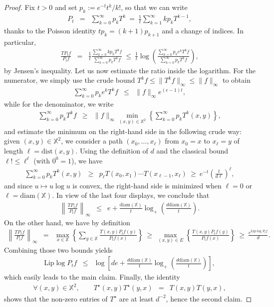 \documentclass[12pt,final]{article}
\numberwithin{equation}{section}
\newcommand{\Lip}{\mathrm {Lip}}
\newcommand{\dX}{\mathbb{X}}
\newcommand{\dist}{\mathrm{dist}}
\newcommand{\diam}{\mathrm{diam}}
\begin{document}
\begin{proof}
Fix $t>0$ and set $p_k:=e^{-t}t^k/k!$, so that we can write
\begin{eqnarray*}
P_t & = & \sum_{k=0}^\infty p_k T^{k} \ = \ \frac{1}{t}\sum_{k=1}^\infty {kp_{k}}T^{k-1}, 
\end{eqnarray*}
thanks to the Poisson identity $tp_k=(k+1)p_{k+1}$ and a change of indices. In particular, 
\begin{eqnarray*}
\frac{TP_t f}{P_tf} & = & \frac{1}{t}\frac{\sum_{k=0}^\infty k p_{k} T^{k}f}{\sum_{k=0}^\infty p_{k} T^{k}f} \
 \le \ \frac{1}{t}\log\left(\frac{\sum_{k=0}^\infty p_{k}e^k T^{k}f}{\sum_{k=0}^\infty p_{k} T^{k}f}\right),
 \end{eqnarray*}
by Jensen's inequality. Let us now estimate the ratio inside the logarithm. For the numerator, we simply use the crude bound $T^kf\le \|T^k f\|_\infty\le \|f\|_\infty$ to obtain
\begin{eqnarray*}
\sum_{k=0}^\infty p_{k}e^k T^{k}f & \le & \|f\|_\infty e^{(e-1)t},
\end{eqnarray*}
while for the denominator, we write
\begin{eqnarray*}
\sum_{k=0}^\infty p_{k} T^{k}f & \ge & \|f\|_\infty \min_{(x,y)\in\dX^2}\left\{\sum_{k=0}^\infty p_{k} T^{k}(x,y)\right\},
\end{eqnarray*}
and  estimate the minimum on the right-hand side in the following crude way: given $(x,y)\in\dX^2$, we consider a path $(x_0,\ldots,x_\ell)$ from $x_0=x$ to $x_\ell=y$ of length  $\ell=\dist(x,y)$. Using the definition of $d$  and the classical bound  $\ell!\le \ell^\ell$ (with $0^0=1$), we have
\begin{eqnarray*}
\sum_{k=0}^\infty p_kT^k(x,y) & \ge & p_\ell T(x_0,x_1)\cdots T(x_{\ell-1},x_\ell)\ \ge \ e^{-t}\left(\frac{t}{d\ell}\right)^\ell,
 \end{eqnarray*} 
and since $u\mapsto u\log u$ is convex, the right-hand side is minimized when $\ell=0$ or $\ell=\diam(\dX)$. In view of the last four displays, we conclude that
\begin{eqnarray*}
\left\|\frac{TP_t f}{P_tf} \right\|_\infty & \le & e+\frac{\diam(\dX)}{t}\log_+\left(\frac{d\diam(\dX)}{t}\right).
 \end{eqnarray*}
On the other hand,  we  have by definition
\begin{eqnarray*}
\left\|\frac{TP_t f}{P_tf} \right\|_\infty & = & \max_{x\in\dX}\left\{\sum_{y\in\dX}\frac{T(x,y)P_tf(y)}{P_tf(x)}\right\} \ \ge \  \max_{(x,y)\in E}\left\{\frac{T(x,y)P_tf(y)}{P_tf(x)}\right\} \ \ge \ \frac{e^{\Lip\log P_tf}}{d}.
\end{eqnarray*}
Combining those two bounds yields 
\begin{eqnarray*}
\Lip\log P_tf & \le & \log\left[de+\frac{d\diam(\dX)}{t}\log_+\left(\frac{d\diam(\dX)}{t}\right)\right],
\end{eqnarray*}
which easily leads to the main claim. Finally,  the identity 
\begin{eqnarray*}
\forall (x,y)\in\dX^2,\qquad T^\star(x,y)T^\star(y,x) & = & T(x,y)T(y,x),
\end{eqnarray*}
shows that the non-zero entries of $T^\star$ are at least $d^{-2}$, hence the second claim. 
\end{proof}
\end{document}
